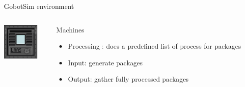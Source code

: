 \begin{frame}{GobotSim environment}
    \begin{columns}
        \begin{column}{0.2\textwidth}
            \includegraphics[width = 0.8\textwidth]{images/godot/machine_texture.png}
        \end{column}
        \begin{column}{0.7\textwidth}
            Machines
            \begin{itemize}
                \item Processing : does a predefined list of process for packages
                \item Input: generate packages
                \item Output: gather fully processed packages
            \end{itemize}

        \end{column}
    \end{columns}


\end{frame}
